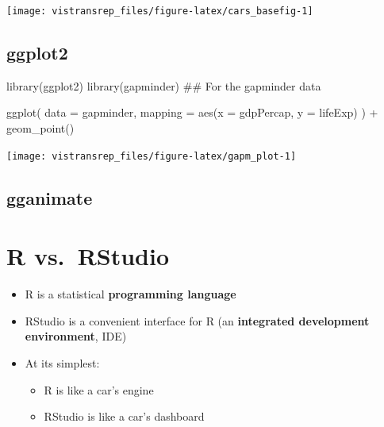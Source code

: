 \documentclass[]{book}
\newenvironment{Shaded}{}{}
\newcommand{\DataTypeTok}[1]{#1}
\newcommand{\KeywordTok}[1]{\textcolor[rgb]{0.00,0.00,1.00}{#1}}
\newcommand{\NormalTok}[1]{#1}
\newcommand{\OperatorTok}[1]{#1}
\newcommand{\StringTok}[1]{\textcolor[rgb]{0.00,0.50,0.50}{#1}}
\providecommand{\tightlist}{%
  \setlength{\itemsep}{0pt}\setlength{\parskip}{0pt}}
\begin{document}
\begin{flushright}\texttt{[image: vistransrep\_files/figure-latex/cars\_basefig-1]} \end{flushright}

\hypertarget{ggplot2}{%
\subsection{ggplot2}\label{ggplot2}}

\begin{Shaded}
\begin{Highlighting}[]
\KeywordTok{library}\NormalTok{(ggplot2)}
\KeywordTok{library}\NormalTok{(gapminder) ## For the gapminder data}

\KeywordTok{ggplot}\NormalTok{(}
  \DataTypeTok{data =}\NormalTok{ gapminder,}
  \DataTypeTok{mapping =} \KeywordTok{aes}\NormalTok{(}\DataTypeTok{x =}\NormalTok{ gdpPercap, }\DataTypeTok{y =}\NormalTok{ lifeExp)}
\NormalTok{) }\OperatorTok{+}
\StringTok{  }\KeywordTok{geom_point}\NormalTok{()}
\end{Highlighting}
\end{Shaded}

\begin{flushright}\texttt{[image: vistransrep\_files/figure-latex/gapm\_plot-1]} \end{flushright}

\hypertarget{gganimate}{%
\subsection{gganimate}\label{gganimate}}

\hypertarget{r-vs.rstudio}{%
\section{R vs.~RStudio}\label{r-vs.rstudio}}

\begin{itemize}
\tightlist
\item
  R is a statistical \textbf{programming language}
\item
  RStudio is a convenient interface for R (an \textbf{integrated development environment}, IDE)
\item
  At its simplest:

  \begin{itemize}
  \tightlist
  \item
    R is like a car's engine
  \item
    RStudio is like a car's dashboard
  \end{itemize}
\end{itemize}
\end{document}
